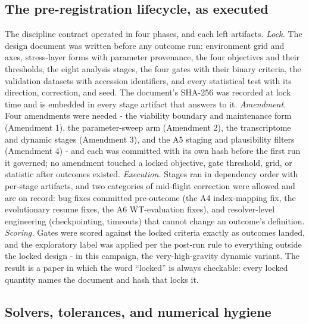 \documentclass[12pt]{article}
\begin{document}
\subsection{The pre-registration lifecycle, as executed}
\label{sec:prereglifecycle}

The discipline contract operated in four phases, and each left
artifacts. \emph{Lock.} The design document was written before any
outcome run: environment grid and axes, stress-layer forms with
parameter provenance, the four objectives and their thresholds, the
eight analysis stages, the four gates with their binary criteria, the
validation datasets with accession identifiers, and every statistical
test with its direction, correction, and seed. The document's SHA-256
was recorded at lock time and is embedded in every stage artifact
that answers to it. \emph{Amendment.} Four amendments were needed -
the viability boundary and maintenance form (Amendment 1), the
parameter-sweep arm (Amendment 2), the transcriptome and dynamic
stages (Amendment 3), and the A5 staging and plausibility filters
(Amendment 4) - and each was committed with its own hash before the
first run it governed; no amendment touched a locked objective, gate
threshold, grid, or statistic after outcomes existed. \emph{Execution.}
Stages ran in dependency order with per-stage artifacts, and two
categories of mid-flight correction were allowed and are on record:
bug fixes committed pre-outcome (the A4 index-mapping fix, the
evolutionary resume fixes, the A6 WT-evaluation fixes), and
resolver-level engineering (checkpointing, timeouts) that cannot
change an outcome's definition. \emph{Scoring.} Gates were scored
against the locked criteria exactly as outcomes landed, and the
exploratory label was applied per the post-run rule to everything
outside the locked design - in this campaign, the very-high-gravity
dynamic variant. The result is a paper in which the word ``locked''
is always checkable: every locked quantity names the document and
hash that locks it.

\subsection{Solvers, tolerances, and numerical hygiene}
\end{document}
